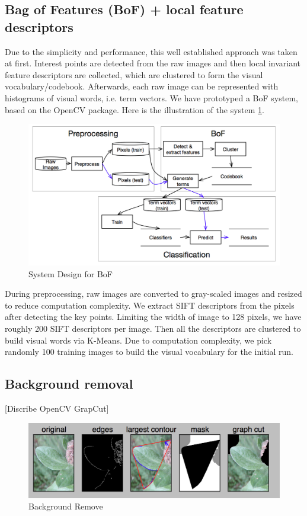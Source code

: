 \documentclass[journal, 10pt]{IEEEtran}
\begin{document}
\subsection{Bag of Features (BoF) + local feature descriptors}
   Due to the simplicity and performance, this well established approach was taken at first. Interest points are detected from the raw images and then local invariant feature descriptors are collected, which are clustered to form the visual vocabulary/codebook. Afterwards, each raw image can be represented with histograms of visual words, i.e. term vectors.  We have prototyped a BoF system, based on the OpenCV package.  Here is the illustration of the system \ref{fig:bofsystemdesign}.
\newpage
\begin{figure}
  \centering
  \includegraphics[scale=0.2]{flowchart}
  \caption{ System Design for BoF }
  \label{fig:bofsystemdesign}
\end{figure}
During preprocessing, raw images are converted to gray-scaled images and resized to reduce computation complexity. We extract SIFT descriptors from the pixels after detecting the key points. Limiting the width of image to 128 pixels, we have roughly 200 SIFT descriptors per image. Then all the descriptors are clustered to build visual words via K-Means. Due to computation complexity, we pick randomly 100 training images to build the visual vocabulary for the initial run.
\subsection{Background removal}
[Discribe OpenCV GrapCut]
\newpage
\begin{figure}
  \centering
  \includegraphics[scale=0.2]{backgroundremoval}
  \caption{ Background Remove }
  \label{fig:backgroundremoval}
\end{figure}
\end{document}
